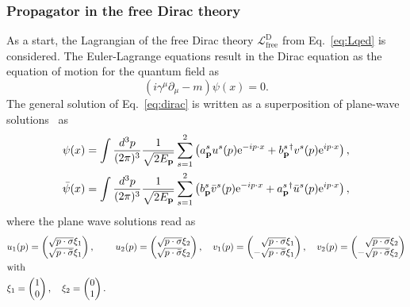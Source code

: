 \subsubsection*{Propagator in the free Dirac theory}
As a start, the Lagrangian of the free Dirac theory $\mathcal{L}_{\text{free}}^{\text{D}}$ from Eq.~\eqref{eq:Lqed} is considered. The Euler-Lagrange equations result in the Dirac equation as the equation of motion for the quantum field as
\begin{equation}
\label{eq:dirac}
\left( i\gamma^\mu \partial_\mu -m \right) \psi(x) = 0.
\end{equation}
The general solution of Eq.~\eqref{eq:dirac} is written as a superposition of plane-wave solutions~\mbox{\cite[Section~3.3.]{peskin1995}} as
\begin{alignat}{2}
& \psi(x) = 
\int \frac{\mathrm{}d^3p}{(2\pi)^3}\frac{1}{\sqrt{2E_\mathbf{p}}} 
\sum_{s=1}^{2} \left(a^s_\mathbf{p}u^s(p) \text{e}^{-ip\cdot x} + b^{s\,\dagger}_{\mathbf{p}}v^s(p) \text{e}^{ip\cdot x} \right),\\
& \bar{\psi}(x) = 
\int \frac{\mathrm{}d^3p}{(2\pi)^3}\frac{1}{\sqrt{2E_\mathbf{p}}} 
\sum_{s=1}^{2} \left(b^s_\mathbf{p}\bar{v}^s(p) \text{e}^{-ip\cdot x} + a^{s\,\dagger}_{\mathbf{p}}\bar{u}^s(p) \text{e}^{ip\cdot x} \right),\\
\end{alignat}
where the plane wave solutions read as
\begin{alignat}{4}
& u_1(p)= \begin{pmatrix}\sqrt{p\cdot \sigma}\xi_1\\\sqrt{p\cdot \bar{\sigma}}\xi_1\end{pmatrix},\,&& 
u_2(p)= \begin{pmatrix}\sqrt{p\cdot \sigma}\xi_2\\\sqrt{p\cdot \bar{\sigma}}\xi_2\end{pmatrix},\,&& 
v_1(p)= \begin{pmatrix}\phantom{-}\sqrt{p\cdot \sigma}\xi_1\\-\sqrt{p\cdot \bar{\sigma}}\xi_1\end{pmatrix},\,&& 
v_2(p)= \begin{pmatrix}\phantom{-}\sqrt{p\cdot \sigma}\xi_2\\-\sqrt{p\cdot \bar{\sigma}}\xi_2\end{pmatrix}\notag\\
&\text{with}\\
&\xi_1=\begin{pmatrix}1\\0\end{pmatrix},\quad
\xi_2=\begin{pmatrix}0\\1\end{pmatrix}.\notag
\end{alignat}
